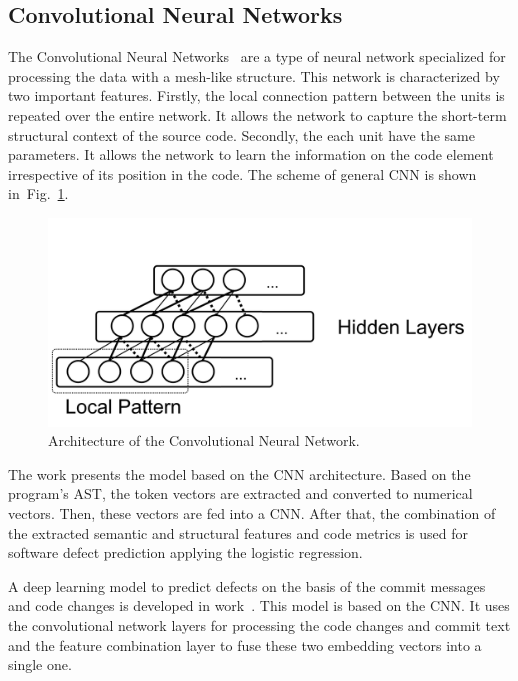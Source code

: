 \documentclass[mathematics,review,submit,moreauthors,pdftex]{Definitions/mdpi}
\begin{document}
\subsection{Convolutional Neural Networks}

The Convolutional Neural Networks~\cite{Goodfellow-et-al-2016} are a type of neural network specialized for processing the data with a mesh-like structure. This network is characterized by two important features. Firstly, the local connection pattern between the units is repeated over the entire network. It allows the network to capture the short-term structural context of the source code. Secondly, the each unit have the same parameters. It allows the network to learn the information on the code element irrespective of its position in the code.
The scheme of general CNN is shown in~Fig.~\ref{fig4}.

\begin{figure}[ht] %
\centering
\includegraphics[width=10.5 cm]{f4.png}
\caption{Architecture of the Convolutional Neural Network.}
\label{fig4} %
\end{figure}

The work \cite{LiEtAl2017} presents the model based on the CNN architecture. Based on the program's AST, the token vectors are extracted and converted to numerical vectors. Then, these vectors are fed into a CNN. After that, the combination of the extracted semantic and structural features and code metrics is used for software defect prediction applying the logistic regression.

A deep learning model to predict defects on the basis of the commit messages and code changes is developed in work~\cite{HoangEtAl2019}. This model is based on the CNN. It uses the convolutional network layers for processing the code changes and commit text and the feature combination layer to fuse these two embedding vectors into a single one.
\end{document}
